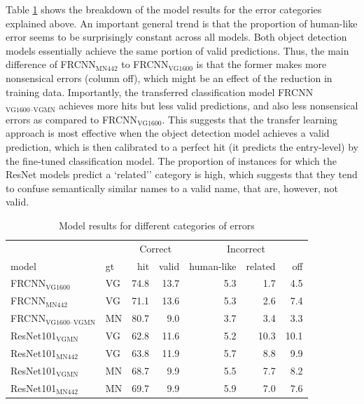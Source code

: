 Table \ref{tab:humanlike} shows the breakdown of the model results for the error categories explained above. An important general trend is that the proportion of human-like error seems to be surprisingly constant across all models. 
Both object detection models essentially achieve the same portion of valid predictions. Thus, the main difference of FRCNN$_{\text{MN442}}$ to  FRCNN$_{\text{VG1600}}$ is that the former makes more nonsensical errors (column off), which might be an effect of the reduction in training data.
Importantly, the transferred classification model FRCNN$_{\text{VG1600--VGMN}}$ achieves more hits but less valid predictions, and also less nonsensical errors as compared to FRCNN$_{\text{VG1600}}$.
This suggests that the transfer learning approach is most effective when the object detection model achieves a valid prediction, which is then calibrated to a perfect hit (it predicts the entry-level) by the fine-tuned classification model.
The proportion of instances for which the ResNet models predict a `related'' category is high, which suggests that they tend to confuse semantically similar names to a valid name, that are, however, not valid. 

\begin{table}[t]
\centering
	\small
\begin{tabular}{ll||rr|rrr}
\toprule
&  & \multicolumn{2}{c|}{Correct} & \multicolumn{3}{c}{Incorrect}\\
                         model &  gt &  hit &  valid &  human-like &  related &  off \\
\midrule
       FRCNN$_{\text{VG1600}}$ &  VG & 74.8 &     13.7 &         5.3 &      1.7 &    4.5 \\
        FRCNN$_{\text{MN442}}$ &  VG & 71.1 &     13.6 &         5.3 &      2.6 &    7.4 \\
        \midrule
 FRCNN$_{\text{VG1600--VGMN}}$ &  MN & 80.7 &      9.0 &         3.7 &      3.4 &    3.3 \\
         \midrule
     ResNet101$_{\text{VGMN}}$ &  VG & 62.8 &     11.6 &         5.2 &     10.3 &   10.1 \\
         ResNet101$_{\text{MN442}}$ &  VG & 63.8 &     11.9 &         5.7 &      8.8 &    9.9 \\
     ResNet101$_{\text{VGMN}}$ &  MN & 68.7 &      9.9 &         5.5 &      7.7 &    8.2 \\
    ResNet101$_{\text{MN442}}$ &  MN & 69.7 &      9.9 &         5.9 &      7.0 &    7.6 \\
\bottomrule
\end{tabular}

\caption{Model results for different categories of errors} \label{tab:humanlike}
\end{table}


